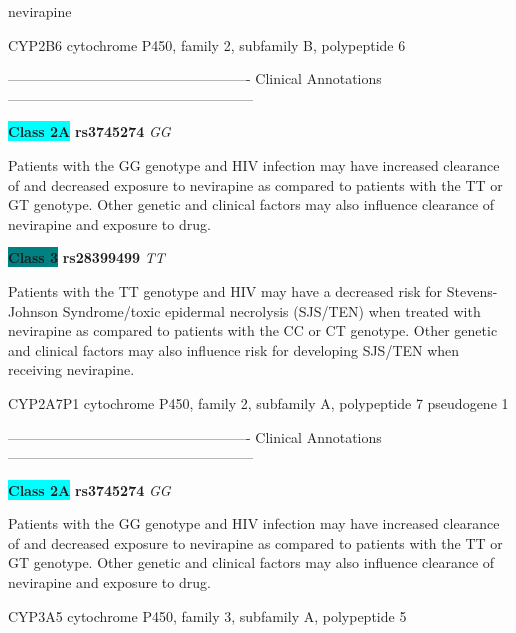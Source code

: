 \documentclass{resume} %
\begin{document}
\begin{rSection}{ nevirapine }
\begin{rSubsection}{ CYP2B6 }{ cytochrome P450, family 2, subfamily B, polypeptide 6 }{}{}
\item[] ---------------------------------------------------- Clinical Annotations -----------------------------------------------------\newline
\item \textbf{\colorbox{cyan} {Class 2A}} \textbf{ rs3745274 } \textit{ GG }
\item[] Patients with the GG genotype and HIV infection may have increased clearance of and decreased exposure to nevirapine as compared to patients with the TT or GT genotype. Other genetic and clinical factors may also influence clearance of nevirapine and exposure to drug.\item \textbf{\colorbox{teal} {Class 3}} \textbf{ rs28399499 } \textit{ TT }
\item[] Patients with the TT genotype and HIV may have a decreased risk for Stevens-Johnson Syndrome/toxic epidermal necrolysis (SJS/TEN) when treated with nevirapine as compared to patients with the CC or CT genotype. Other genetic and clinical factors may also influence risk for developing SJS/TEN when receiving nevirapine.
\end{rSubsection}\begin{rSubsection}{ CYP2A7P1 }{ cytochrome P450, family 2, subfamily A, polypeptide 7 pseudogene 1 }{}{}
\item[]

\item[] ---------------------------------------------------- Clinical Annotations -----------------------------------------------------\newline
\item \textbf{\colorbox{cyan} {Class 2A}} \textbf{ rs3745274 } \textit{ GG }
\item[] Patients with the GG genotype and HIV infection may have increased clearance of and decreased exposure to nevirapine as compared to patients with the TT or GT genotype. Other genetic and clinical factors may also influence clearance of nevirapine and exposure to drug.
\end{rSubsection}\begin{rSubsection}{ CYP3A5 }{ cytochrome P450, family 3, subfamily A, polypeptide 5 }{}{}
\item[]


\end{rSubsection}
\end{rSection}
\end{document}
